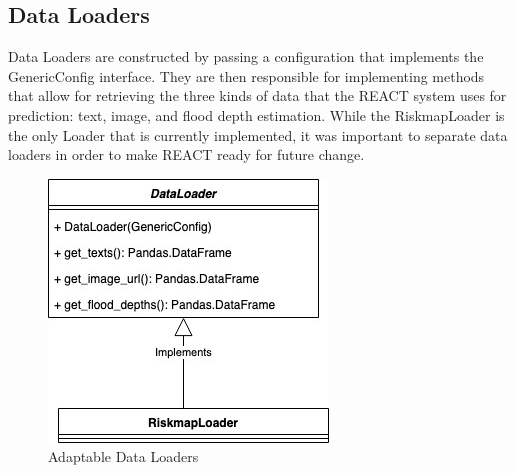 \subsection{Data Loaders}
Data Loaders are constructed by passing a configuration that implements the 
GenericConfig interface. They are then responsible for implementing methods 
that allow for retrieving the three kinds of data that the REACT system 
uses for prediction: text, image, and flood depth estimation. While the
RiskmapLoader is the only Loader that is currently implemented, it was 
important to separate data loaders in order to make REACT ready for future change.

\begin{figure}[ht]
    \centering
    \includegraphics[scale=0.6]{images/loaders.jpg}
    \caption{Adaptable Data Loaders}
    \label{fig:data_loaders}
\end{figure}

